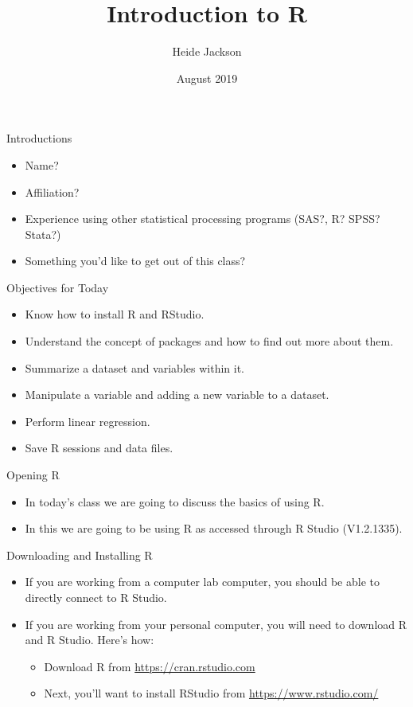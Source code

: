 \documentclass{beamer}
\title{Introduction to R}
\author{Heide Jackson }
\date{August 2019}
\begin{document}
\maketitle

\begin{frame}{Introductions}
\begin{itemize}
\item Name?
\item Affiliation?
\item Experience using other statistical processing programs (SAS?, R? SPSS? Stata?)
\item Something you'd like to get out of this class?
\end{itemize}
\end{frame}

\begin{frame}{Objectives for Today}
\begin{itemize}
    \item Know how to install R and RStudio.
    \item Understand the concept of packages and how to find out more about them.
    \item Summarize a dataset and variables within it.
    \item Manipulate a variable and adding a new variable to a dataset.
    \item Perform linear regression.
    \item Save R sessions and data files.
\end{itemize}
\end{frame}

\begin{frame}{Opening R}
\begin{itemize}
    \item In today's class we are going to discuss the basics of using R.
    \item In this we are going to be using R as accessed through R Studio (V1.2.1335).

\end{itemize}
\end{frame}

\begin{frame}{Downloading and Installing R}
\begin{itemize}
    \item If you are working from a computer lab computer, you should be able to directly connect to R Studio.
    \item If you are working from your personal computer, you will need to download R and R Studio.  Here's how:
    \begin{itemize}
        \item Download R from \url{https://cran.rstudio.com}
    \item Next, you'll want to install RStudio from \url{https://www.rstudio.com/}
   \end{itemize} 
\end{itemize}
\end{frame}
\end{document}
